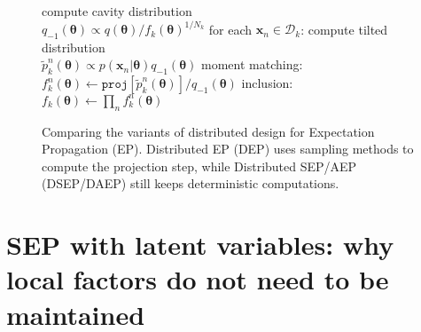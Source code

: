 \documentclass{article} %
\begin{document}
\begin{figure}[!t]
\begin{minipage}[t]{0.33\linewidth}
\begin{algorithm}[H]
\begin{algorithmic}[1]
	\STATE compute cavity distribution \\ $q_{-1}(\bm{\theta}) \propto q(\bm{\theta}) / f_k(\bm{\theta})^{1 / N_k}$
	\STATE for each $\bm{x}_n \in \mathcal{D}_k$:
	\STATE \quad compute tilted distribution \\$\tilde{p}_k^n(\bm{\theta}) \propto p(\bm{x}_n|\bm{\theta}) q_{-1}(\bm{\theta})$
	\STATE \quad moment matching: \\\hspace{-1mm}$f_k^n(\bm{\theta}) \leftarrow \mathtt{proj}[\tilde{p}_k^n(\bm{\theta})] / q_{-1}(\bm{\theta}) $
	\STATE inclusion:\\ $f_k(\bm{\theta}) \leftarrow \prod_n f_k^n(\bm{\theta})$
\end{algorithmic}
\end{algorithm}
\end{minipage} 
%
\caption{Comparing the variants of distributed design for Expectation Propagation (EP). Distributed EP (DEP) uses sampling methods to compute the projection step, while Distributed SEP/AEP (DSEP/DAEP) still keeps deterministic computations.}
\end{figure}

\section{SEP with latent variables: why local factors do not need to be maintained}
\end{document}
